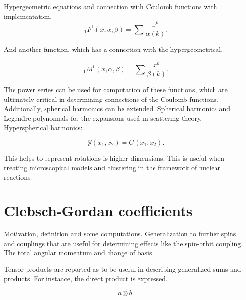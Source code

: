 \documentclass[openany]{book}
\begin{document}
Hypergeometric equations and connection with Coulomb functions with implementation. \\

\begin{equation}\label{eq:selected_hyper}
{}_{1}F^{1}(x, \alpha, \beta) = \sum {\frac{x^k}{\alpha(k)}}.
\end{equation}

And another function, which has a connection with the hypergeometrical.

\begin{equation}\label{eq:selected_hyper_additional}
	{}_{1}M^{1}(x, \alpha, \beta) = \sum {\frac{x^k}{\beta(k)}}.
\end{equation}

The power series can be used for computation of these functions, which are ultimately critical in determining connections of the Coulomb functions. \\

Additionally, spherical harmonics can be extended.
Spherical harmonics and Legendre polynomials for the expansions used in scattering theory.  Hyperspherical harmonics:

\begin{equation}\label{eq:selected_hyperSphericalHarmonic}
	\mathcal{Y}(x_1, x_2) = G(x_1, x_2). 
\end{equation}

This helps to represent rotations is higher dimensions. This is useful when treating microscopical models and clustering in the framework of nuclear reactions. 

\section{Clebsch-Gordan coefficients} \label{sec:clebschGordan}

Motivation, definition and some computations. Generalization to further spins and couplings that are useful for determining effects like the spin-orbit coupling. \\

The total angular momentum and change of basis.

Tensor products are reported as to be useful in describing generalized sums and products. For instance, the direct product is expressed.

\begin{equation} \label{eq:angularMomentum_tensorSum}
	a \otimes b.
\end{equation}
\end{document}
